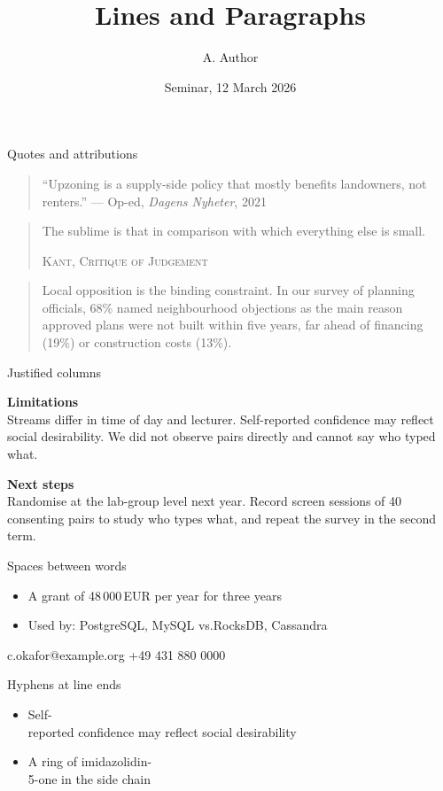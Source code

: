 \documentclass[aspectratio=169]{beamer}
\title{Lines and Paragraphs}
\author{A. Author}
\institute{Department of Comparative Literature\\University of Geneva}
\date{Seminar, 12 March 2026}
\newcommand{\attrib}[1]{\par\hfill\textsc{#1}}
\begin{document}
\begin{frame}
\titlepage
\end{frame}

\begin{frame}{Quotes and attributions}
\begin{quote}
``Upzoning is a supply-side policy that mostly benefits landowners, not renters.''
\hfill --- Op-ed, \emph{Dagens Nyheter}, 2021
\end{quote}
\begin{quote}
The sublime is that in comparison with which everything else is small.
\attrib{Kant, Critique of Judgement}
\end{quote}
\begin{quotation}
\footnotesize
Local opposition is the binding constraint. In our survey of planning officials, 68\% named
neighbourhood objections as the main reason approved plans were not built within five years,
far ahead of financing (19\%) or construction costs (13\%).
\end{quotation}
\end{frame}

\begin{frame}{Justified columns}
\parbox[t]{0.47\textwidth}{\textbf{Limitations}\\[1mm]\small
Streams differ in time of day and lecturer. Self-reported confidence
may reflect social desirability. We did not observe pairs directly and
cannot say who typed what.}
\hfill
\parbox[t]{0.47\textwidth}{\textbf{Next steps}\\[1mm]\small
Randomise at the lab-group level next year. Record screen sessions
of 40 consenting pairs to study who types what, and repeat the survey
in the second term.}
\end{frame}

\begin{frame}{Spaces between words}
\begin{itemize}
\item A grant of 48\,000\,EUR per year for three years
\item Used by: PostgreSQL, MySQL \quad vs.\quad RocksDB, Cassandra
\end{itemize}
\vfill
{\small c.okafor@example.org \quad\textbullet\quad +49 431 880 0000}
\vfill
\end{frame}

\begin{frame}{Hyphens at line ends}
\begin{itemize}
\item Self-\\reported confidence may reflect social desirability
\item A ring of imidazolidin-\\5-one in the side chain
\end{itemize}
\end{frame}
\end{document}
